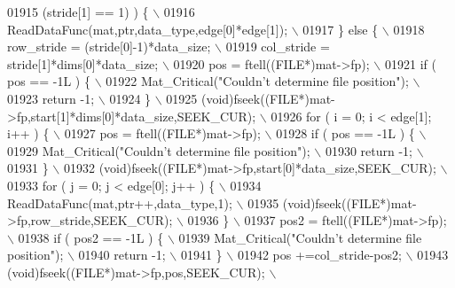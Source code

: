 \begin{DoxyCode}
{{{{{{{{{01915 \textcolor{preprocessor}{             (stride[1] == 1) ) \{ \(\backslash\)}
01916 \textcolor{preprocessor}{            ReadDataFunc(mat,ptr,data\_type,edge[0]*edge[1]); \(\backslash\)}
01917 \textcolor{preprocessor}{        \} else \{ \(\backslash\)}
01918 \textcolor{preprocessor}{            row\_stride = (stride[0]-1)*data\_size; \(\backslash\)}
01919 \textcolor{preprocessor}{            col\_stride = stride[1]*dims[0]*data\_size; \(\backslash\)}
01920 \textcolor{preprocessor}{            pos = ftell((FILE*)mat->fp); \(\backslash\)}
01921 \textcolor{preprocessor}{            if ( pos == -1L ) \{ \(\backslash\)}
01922 \textcolor{preprocessor}{                Mat\_Critical("Couldn't determine file position"); \(\backslash\)}
01923 \textcolor{preprocessor}{                return -1; \(\backslash\)}
01924 \textcolor{preprocessor}{            \} \(\backslash\)}
01925 \textcolor{preprocessor}{            (void)fseek((FILE*)mat->fp,start[1]*dims[0]*data\_size,SEEK\_CUR); \(\backslash\)}
01926 \textcolor{preprocessor}{            for ( i = 0; i < edge[1]; i++ ) \{ \(\backslash\)}
01927 \textcolor{preprocessor}{                pos = ftell((FILE*)mat->fp); \(\backslash\)}
01928 \textcolor{preprocessor}{                if ( pos == -1L ) \{ \(\backslash\)}
01929 \textcolor{preprocessor}{                    Mat\_Critical("Couldn't determine file position"); \(\backslash\)}
01930 \textcolor{preprocessor}{                    return -1; \(\backslash\)}
01931 \textcolor{preprocessor}{                \} \(\backslash\)}
01932 \textcolor{preprocessor}{                (void)fseek((FILE*)mat->fp,start[0]*data\_size,SEEK\_CUR); \(\backslash\)}
01933 \textcolor{preprocessor}{                for ( j = 0; j < edge[0]; j++ ) \{ \(\backslash\)}
01934 \textcolor{preprocessor}{                    ReadDataFunc(mat,ptr++,data\_type,1); \(\backslash\)}
01935 \textcolor{preprocessor}{                    (void)fseek((FILE*)mat->fp,row\_stride,SEEK\_CUR); \(\backslash\)}
01936 \textcolor{preprocessor}{                \} \(\backslash\)}
01937 \textcolor{preprocessor}{                pos2 = ftell((FILE*)mat->fp); \(\backslash\)}
01938 \textcolor{preprocessor}{                if ( pos2 == -1L ) \{ \(\backslash\)}
01939 \textcolor{preprocessor}{                    Mat\_Critical("Couldn't determine file position"); \(\backslash\)}
01940 \textcolor{preprocessor}{                    return -1; \(\backslash\)}
01941 \textcolor{preprocessor}{                \} \(\backslash\)}
01942 \textcolor{preprocessor}{                pos +=col\_stride-pos2; \(\backslash\)}
01943 \textcolor{preprocessor}{                (void)fseek((FILE*)mat->fp,pos,SEEK\_CUR); \(\backslash\)}
}}}}}}}}}
\end{DoxyCode}
